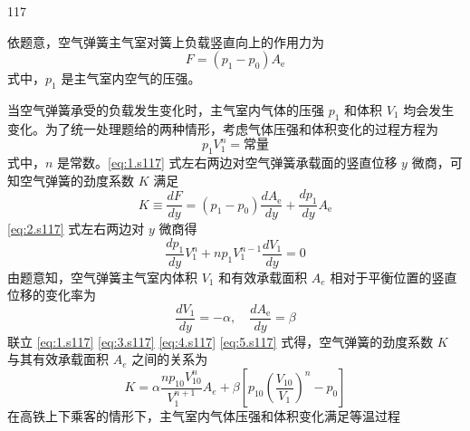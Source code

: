 \begin{solution}{117}
    \begin{subsolution}
        \begin{subsubsolution}
            依题意，空气弹簧主气室对簧上负载竖直向上的作用力为
            \begin{equation}
                F = (p_{1} - p_{0}) A_{\mathrm{e}}
                \label{eq:1.s117}
            \end{equation}
            式中，$p_{1}$ 是主气室内空气的压强。

            当空气弹簧承受的负载发生变化时，主气室内气体的压强 $p_{1}$ 和体积 $V_{1}$ 均会发生变化。为了统一处理题给的两种情形，考虑气体压强和体积变化的过程方程为
            \begin{equation}
                p_{1} V_{1}^{n} = \mathrm{常量}
                \label{eq:2.s117}
            \end{equation}
            式中，$n$ 是常数。\eqref{eq:1.s117} 式左右两边对空气弹簧承载面的竖直位移 $y$ 微商，可知空气弹簧的劲度系数 $K$ 满足
            \begin{equation}
                K \equiv \frac{dF}{dy} = (p_{1} - p_{0}) \frac{dA_{\mathrm{e}}}{dy} + \frac{dp_{1}}{dy} A_{\mathrm{e}}
                \label{eq:3.s117}
            \end{equation}
            \eqref{eq:2.s117} 式左右两边对 $y$ 微商得
            \begin{equation}
                \frac{dp_{1}}{dy} V_{1}^{n} + n p_{1} V_{1}^{n-1} \frac{dV_{1}}{dy} = 0
                \label{eq:4.s117}
            \end{equation}
            由题意知，空气弹簧主气室内体积 $V_{1}$ 和有效承载面积 $A_{e}$ 相对于平衡位置的竖直位移的变化率为
            \begin{equation}
                \frac{dV_{1}}{dy} = -\alpha, \quad \frac{dA_{\mathrm{e}}}{dy} = \beta
                \label{eq:5.s117}
            \end{equation}
            联立 \eqref{eq:1.s117} \eqref{eq:3.s117} \eqref{eq:4.s117} \eqref{eq:5.s117} 式得，空气弹簧的劲度系数 $K$ 与其有效承载面积 $A_{e}$ 之间的关系为
            \begin{equation}
                K = \alpha \frac{n p_{10} V_{10}^{n}}{V_{1}^{n+1}} A_{e} + \beta \left[ p_{10} \left(\frac{V_{10}}{V_{1}}\right)^{n} - p_{0} \right]
                \label{eq:6.s117}
            \end{equation}
            在高铁上下乘客的情形下，主气室内气体压强和体积变化满足等温过程
            \begin{equation}

\end{equation}
\end{subsubsolution}
\end{subsolution}
\end{solution}
